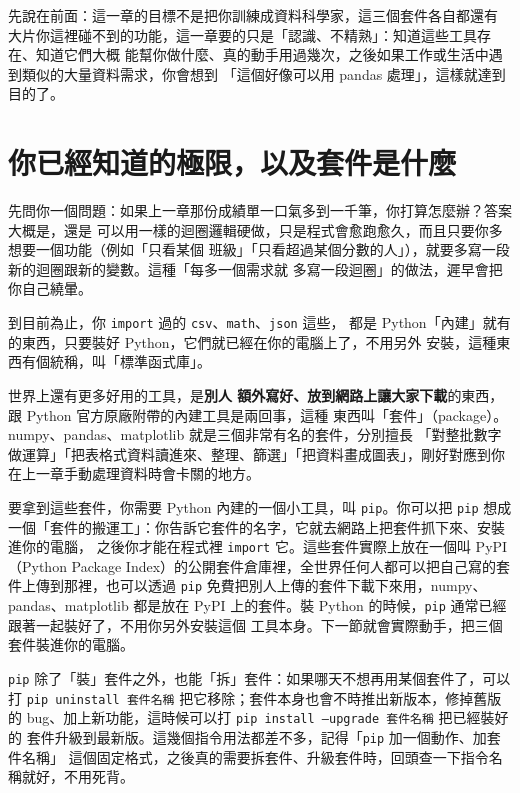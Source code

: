 先說在前面：這一章的目標不是把你訓練成資料科學家，這三個套件各自都還有
大片你這裡碰不到的功能，這一章要的只是「認識、不精熟」：知道這些工具存在、知道它們大概
能幫你做什麼、真的動手用過幾次，之後如果工作或生活中遇到類似的大量資料需求，你會想到
「這個好像可以用 pandas 處理」，這樣就達到目的了。

\section{你已經知道的極限，以及套件是什麼}
\label{sec:packages-and-pip}

先問你一個問題：如果上一章那份成績單一口氣多到一千筆，你打算怎麼辦？答案大概是，還是
可以用一樣的迴圈邏輯硬做，只是程式會愈跑愈久，而且只要你多想要一個功能（例如「只看某個
班級」「只看超過某個分數的人」），就要多寫一段新的迴圈跟新的變數。這種「每多一個需求就
多寫一段迴圈」的做法，遲早會把你自己繞暈。

到目前為止，你 \texttt{import} 過的 \texttt{csv}、\texttt{math}、\texttt{json} 這些，
都是 Python「內建」就有的東西，只要裝好 Python，它們就已經在你的電腦上了，不用另外
安裝，這種東西有個統稱，叫「標準函式庫」。

世界上還有更多好用的工具，是\textbf{別人
額外寫好、放到網路上讓大家下載}的東西，跟 Python 官方原廠附帶的內建工具是兩回事，這種
東西叫「套件」（package）。numpy、pandas、matplotlib 就是三個非常有名的套件，分別擅長
「對整批數字做運算」「把表格式資料讀進來、整理、篩選」「把資料畫成圖表」，剛好對應到你
在上一章手動處理資料時會卡關的地方。

要拿到這些套件，你需要 Python 內建的一個小工具，叫 \texttt{pip}。你可以把 \texttt{pip}
想成一個「套件的搬運工」：你告訴它套件的名字，它就去網路上把套件抓下來、安裝進你的電腦，
之後你才能在程式裡 \texttt{import} 它。這些套件實際上放在一個叫 PyPI（Python Package
Index）的公開套件倉庫裡，全世界任何人都可以把自己寫的套件上傳到那裡，也可以透過
\texttt{pip} 免費把別人上傳的套件下載下來用，numpy、pandas、matplotlib 都是放在 PyPI
上的套件。裝 Python 的時候，\texttt{pip} 通常已經跟著一起裝好了，不用你另外安裝這個
工具本身。下一節就會實際動手，把三個套件裝進你的電腦。

\texttt{pip} 除了「裝」套件之外，也能「拆」套件：如果哪天不想再用某個套件了，可以打
\texttt{pip uninstall 套件名稱} 把它移除；套件本身也會不時推出新版本，修掉舊版的
bug、加上新功能，這時候可以打 \texttt{pip install --upgrade 套件名稱} 把已經裝好的
套件升級到最新版。這幾個指令用法都差不多，記得「\texttt{pip} 加一個動作、加套件名稱」
這個固定格式，之後真的需要拆套件、升級套件時，回頭查一下指令名稱就好，不用死背。

